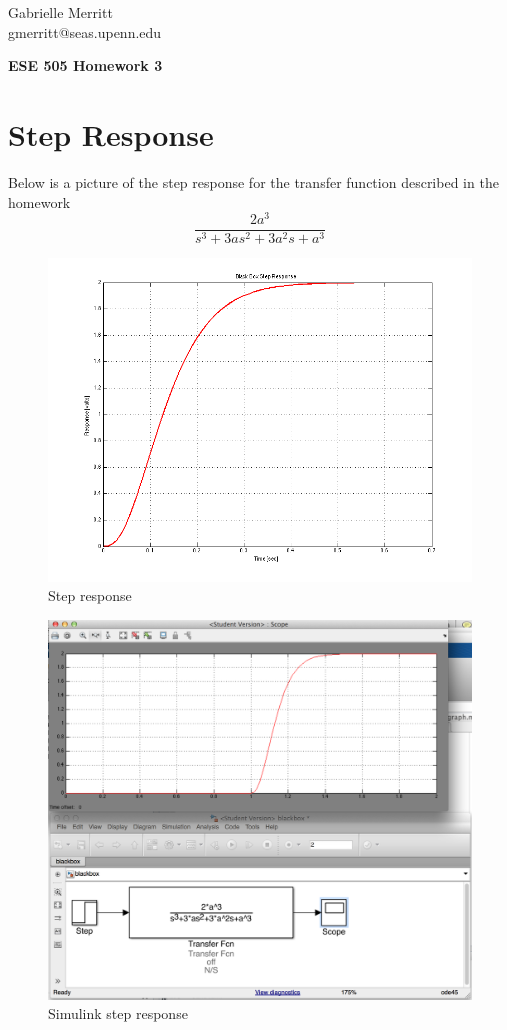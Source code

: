 \documentclass[english]{article}
\begin{document}
Gabrielle Merritt 
\\
gmerritt@seas.upenn.edu 
\begin{center}
{\textbf{ESE 505 Homework 3}} \\

\end{center}

\section{Step Response}
Below is a picture of the step response for the transfer function described in the homework 
$$
\frac{2a^3}{s^3+3as^2 + 3a^2s+ a^3}
$$
\begin{figure}[h!]
\includegraphics[width = \linewidth]{blackbox_step_graph1.png}
\caption{Step response }
\end{figure}
\FloatBarrier 

\begin{figure}[h!]
\includegraphics[width = \linewidth]{simlink1.png}
\caption{Simulink step response}
\end{figure}
\FloatBarrier
\end{document}
